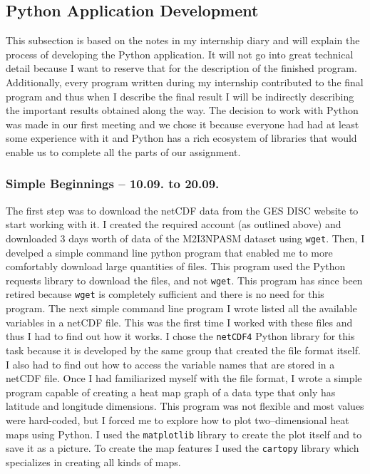 \documentclass[../00_main.tex]{subfiles}
\begin{document}
\subsection{Python Application Development}

This subsection is based on the notes in my internship diary and will explain
the process of developing the Python application. It will not go into great
technical detail because I want to reserve that for the description of the
finished program. Additionally, every program written during my internship
contributed to the final program and thus when I describe the final result
I will be indirectly describing the important results obtained along the way. 
The decision to work with
Python was made in our first meeting and we chose it because everyone had had
at least some experience with it and Python has a rich ecosystem of libraries
that would enable us to complete all the parts of our assignment.\newline

\subsubsection{Simple Beginnings -- 10.09. to 20.09.}


The first step was to download the netCDF data from the GES DISC website to
start working with it. I created the required account (as outlined above) and 
downloaded 3 days worth of data of the M2I3NPASM dataset using \texttt{wget}.
Then, I develped a simple command line python program that enabled me to more
comfortably download large quantities of files. This program used the Python
requests library to download the files, and not \texttt{wget}. This program has
since been retired because \texttt{wget} is completely sufficient and there is
no need for this program. \newline
The next simple command line program I wrote listed all the available variables
in a netCDF file. This was the first time I worked with these files and thus
I had to find out how it works. I chose the \texttt{netCDF4} Python library for
this task because it is developed by the same group that created the file
format itself. I also had to find out how to access the variable names that are
stored in a netCDF file.\newline
Once I had familiarized myself with the file format, I wrote a simple program 
capable of creating a heat map graph of a data type that only has latitude and
longitude dimensions. This program was not flexible and most values were
hard-coded, but I forced me to explore how to plot two--dimensional heat maps
using Python. I used the \texttt{matplotlib} library to create the plot itself
and to save it as a picture. To create the map features I used the
\texttt{cartopy} library which specializes in creating all kinds of maps.
\end{document}
